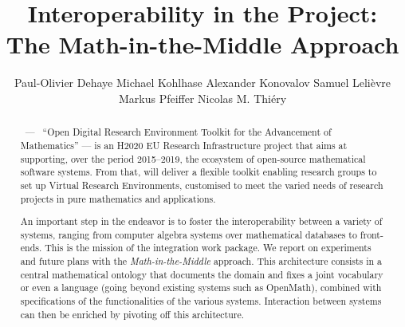 \documentclass{llncs}
\title{Interoperability in the \ODK Project:\\
The Math-in-the-Middle Approach}
\author{Paul-Olivier Dehaye\inst{1} Michael Kohlhase\inst{2} Alexander
  Konovalov\inst{3} Samuel Lelièvre\inst{4} Markus
  Pfeiffer\inst{3} Nicolas M. Thiéry\inst{4}}
\institute{
  University of Z\"urich \and 
  Jacobs University \and 
  University of St~Andrews \and
  Universit\'e Paris-Sud
}
\begin{document}
\maketitle
\begin{abstract}
  \ODK $\,$ --- $\,$ ``Open Digital Research Environment Tool\-kit for the Advancement of
  Mathematics'' --- is an H2020 EU Research Infrastructure project that aims at
  supporting, over the period 2015--2019, the ecosystem of open-source mathematical
  software systems. From that, \ODK will deliver a flexible toolkit enabling research
  groups to set up Virtual Research Environments, customised to meet the varied needs of
  research projects in pure mathematics and applications.

  An important step in the \ODK endeavor is to foster the interoperability between a
  variety of systems, ranging from computer algebra systems over mathematical databases to
  front-ends. This is the mission of the integration work package. We report on
  experiments and future plans with the \emph{Math-in-the-Middle} approach. This architecture consists in a central mathematical ontology that documents the
  domain and fixes a joint vocabulary or even a language (going beyond existing systems such as OpenMath), combined with specifications of the functionalities
  of the various systems. Interaction between systems can then be enriched by pivoting off this architecture.
\end{abstract}








\printbibliography
\end{document}
